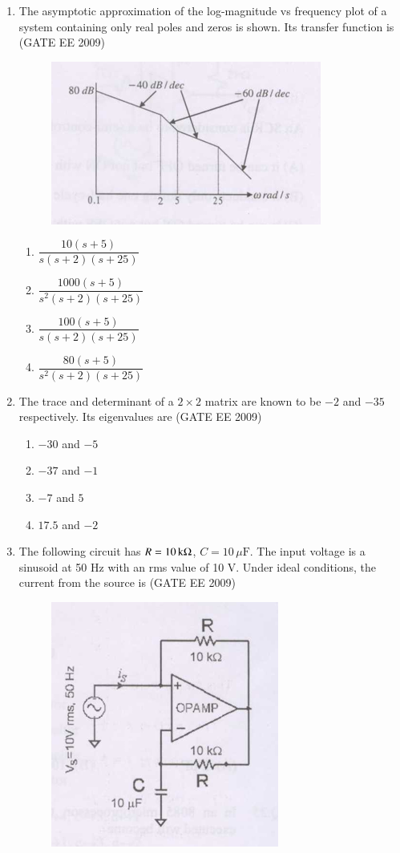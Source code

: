 \documentclass[journal,12pt,onecolumn]{IEEEtran}
\theoremstyle{remark}
\begin{document}
\begin{flushleft}
\begin{enumerate}
\item The asymptotic approximation of the log-magnitude vs frequency plot of a system containing only real poles and zeros is shown. Its transfer function is
\hfill(GATE EE 2009)
\begin{figure}[h!]
    \centering
    \includegraphics[width=0.5\columnwidth]{figs/Screenshot 2025-08-08 194719.png}
    \caption{}
    \label{fig:placeholder}
\end{figure}

\begin{enumerate}
     \item  $\dfrac{10(s+5)}{s (s+2) (s+25)}$
     \item  $\dfrac{1000 (s+5)}{s^{2} (s+2)(s+25)}$
 \item  $\dfrac{100 (s+5)}{s (s+2) (s+25)}$
     \item $\dfrac{80 (s+5)}{s^{2} (s+2) (s+25)}$
\end{enumerate}



\item The trace and determinant of a $2 \times 2$ matrix are known to be $-2$ and $-35$ respectively. Its eigenvalues are
\hfill(GATE EE 2009)
\begin{enumerate}
     \item  $-30$ and $-5$
     \item  $-37$ and $-1$
     \item $-7$ and $5$
     \item $17.5$ and $-2$
\end{enumerate}

\item The following circuit has $R = 10\,\text{k} \ohm$, $C = 10\,\mu\text{F}$. The input voltage is a sinusoid at 50 Hz with an rms value of 10 V. Under ideal conditions, the current from the source is
\hfill(GATE EE 2009)
\begin{figure}[h!]
    \includegraphics[width=0.35\columnwidth]{figs/Screenshot 2025-08-08 200039.png}
    \caption{}
    \label{fig:placeholder}
\end{figure}


\end{enumerate}
\end{flushleft}
\end{document}
